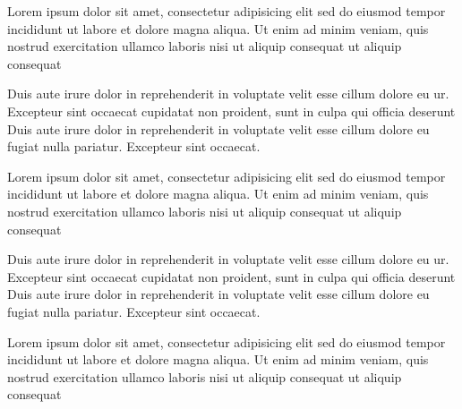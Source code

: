 \documentclass{article}
\begin{document}
\begin{pages}
\begin{Leftside}
Lorem ipsum dolor sit amet, consectetur adipisicing elit
sed do eiusmod tempor incididunt ut labore et dolore
magna aliqua. Ut enim ad minim veniam, quis nostrud
exercitation ullamco laboris nisi
ut aliquip consequat ut aliquip consequat
\pend

Duis aute irure dolor in reprehenderit
in voluptate velit esse cillum dolore eu ur. Excepteur sint occaecat
cupidatat non proident, sunt in culpa qui officia deserunt
Duis aute irure dolor in reprehenderit
in voluptate velit esse cillum dolore eu fugiat nulla
pariatur. Excepteur sint occaecat.
\pend

\endnumbering
\end{Leftside}

\begin{Rightside}

\beginnumbering
{}
Lorem ipsum dolor sit amet, consectetur adipisicing elit
sed do eiusmod tempor incididunt ut labore et dolore
magna aliqua. Ut enim ad minim veniam, quis nostrud
exercitation ullamco laboris nisi
ut aliquip consequat ut aliquip consequat
\pend

Duis aute irure dolor in reprehenderit
in voluptate velit esse cillum dolore eu ur. Excepteur sint occaecat
cupidatat non proident, sunt in culpa qui officia deserunt
Duis aute irure dolor in reprehenderit
in voluptate velit esse cillum dolore eu fugiat nulla
pariatur. Excepteur sint occaecat.
\pend

Lorem ipsum dolor sit amet, consectetur adipisicing elit
sed do eiusmod tempor incididunt ut labore et dolore
magna aliqua. Ut enim ad minim veniam, quis nostrud
exercitation ullamco laboris nisi
ut aliquip consequat ut aliquip consequat
\pend


\end{Rightside}
\end{pages}
\end{document}
